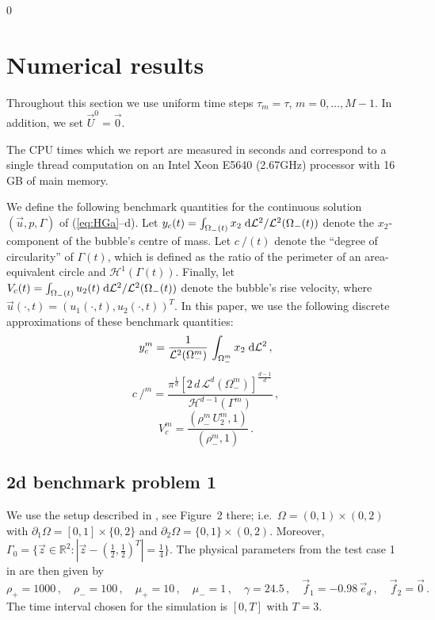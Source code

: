 \documentclass[a4paper,12pt,onecolumn]{article}
\newcommand{\R}{{\mathbb R}}
\newcommand{\dL}[1]{\;{\rm d}{\cal L}^{#1}} %
\newcommand{\strikec}{\mbox{$c\!\!\!\!\:/$}}
\newcommand{\ek}{e}
\begin{document}
\setcounter{equation} 0
\section{Numerical results} \label{sec:numerical_results}
Throughout this section we use uniform time steps $\tau_m=\tau$, $m=0,\ldots,
M-1$. In addition, we set $\vec U^0 = \vec 0$.

The CPU times which we report are measured in seconds and correspond to a
single thread computation on an Intel Xeon E5640 (2.67GHz) processor with 16 GB
of main memory.

We define the following benchmark quantities for the continuous solution $(\vec
u, p, \Gamma)$ of (\ref{eq:HGa}--d).
Let $y_c(t) = \int_{\Omega_-(t)} x_2 \dL2 / \mathcal{L}^2(\Omega_-(t))$ denote
the $x_2$-component of the bubble's centre of mass. Let $\strikec(t)$ denote
the ``degree of circularity'' of $\Gamma(t)$, which is defined as the ratio of
the perimeter of an area-equivalent circle and $\mathcal{H}^{1}(\Gamma(t))$.
Finally, let
$V_c(t) = \int_{\Omega_-(t)} u_2(t) \dL2 / \mathcal{L}^2(\Omega_-(t))$
denote the bubble's rise velocity, where
$\vec u(\cdot,t) = (u_1(\cdot,t),u_2(\cdot,t))^T$.
In this paper, we use the following discrete approximations of
these benchmark quantities:
\begin{equation}
y_c^m = \frac1{\mathcal{L}^2(\Omega_-^m)}\,\int_{\Omega_-^m} x_2 \dL2\,,
\end{equation}
\begin{equation}
\strikec^m =
\frac{\pi^{\frac{1}{d}}[2\,d\,\mathcal{L}^d(\Omega_-^m)]^\frac{d-1}{d}}
{\mathcal{H}^{d-1}(\Gamma^m)}\,,
\end{equation}
\begin{equation}
V^m_c = \frac{(\rho^m_-\,U^m_2, 1)}{(\rho^m_-,1)}\,.
\end{equation}

\subsection{2d benchmark problem 1} \label{sec:2d_benchmark_1}
We use the setup described in \cite{HysingTKPBGT09}, see Figure~2 there;
i.e.\ $\Omega = (0,1) \times (0,2)$ with
$\partial_1\Omega = [0,1] \times \{0,2\}$ and
$\partial_2\Omega = \{0,1\} \times (0,2)$.
Moreover, $\Gamma_0 = \{\vec z \in \R^2 : |\vec z - (\frac12, \frac{1}{2})^T| =
\frac{1}{4}\}$.
The physical parameters from the test case 1 in \cite[Table~I]{HysingTKPBGT09}
are then given by
\begin{equation} \label{eq:Hysing1}
\rho_+ = 1000\,,\quad \rho_- = 100\,,\quad \mu_+ = 10\,,\quad \mu_- = 1\,,\quad
\gamma = 24.5\,,\quad \vec f_1 = -0.98\,\vec\ek_d\,,\quad \vec f_2 = \vec 0\,.
\end{equation}
The time interval chosen for the simulation is $[0,T]$ with $T=3$.
\end{document}
